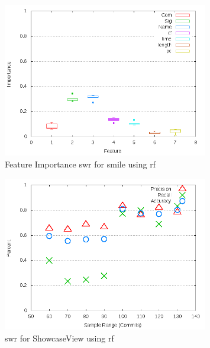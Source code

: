 \begin{figure}[!t]
\centering
\includegraphics[width=0.8\textwidth]{images/rf/test_1/smile_importance.png}
\caption{Feature Importance \gls{swr} for smile using \gls{rf}}
\label{fig:test_1_smile_rf_importance}
\end{figure}

\begin{figure}[!t]
\centering
\includegraphics[width=0.8\textwidth]{images/rf/test_1/ShowcaseView_sample_range.png}
\caption{\gls{swr} for ShowcaseView using \gls{rf}}
\label{fig:test_1_ShowcaseView_rf}
\end{figure}

